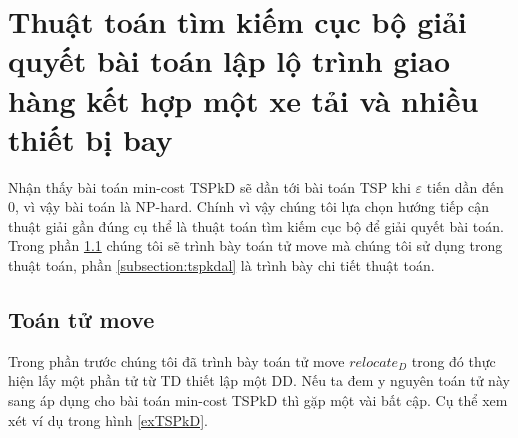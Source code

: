 \documentclass[a4paper,12pt]{report}
\begin{document}
\section{Thuật toán tìm kiếm cục bộ giải quyết bài toán lập lộ trình giao hàng kết hợp một xe tải và nhiều thiết bị bay} 
\label{section:tspkdalo}
Nhận thấy bài toán min-cost \ac{TSPkD} sẽ dần tới bài toán \ac{TSP} khi $\varepsilon$ tiến dần đến 0, vì vậy bài toán là NP-hard. Chính vì vậy chúng tôi lựa chọn hướng tiếp cận thuật giải gần đúng cụ thể là thuật toán tìm kiếm cục bộ để giải quyết bài toán. Trong phần \ref{subsection:ttmove} chúng tôi sẽ trình bày toán tử move mà chúng tôi sử dụng trong thuật toán, phần \ref{subsection:tspkdal} là trình bày chi tiết thuật toán.
\subsection{Toán tử move}
\label{subsection:ttmove}
Trong phần trước chúng tôi đã trình bày toán tử move $relocate_D$ trong đó thực hiện lấy một phần tử từ \ac{TD} thiết lập một \ac{DD}. Nếu ta đem y nguyên toán tử này sang áp dụng cho bài toán min-cost \ac{TSPkD} thì gặp một vài bất cập. Cụ thể xem xét ví dụ trong hình \ref{exTSPkD}.
\end{document}
